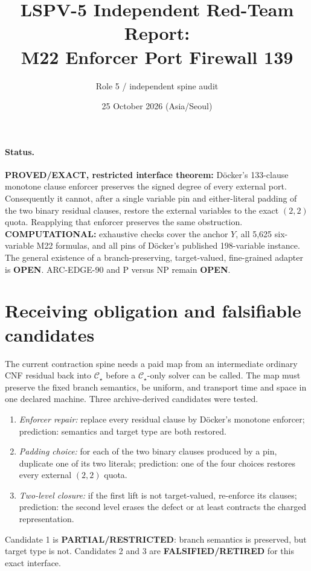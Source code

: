 \documentclass[11pt]{article}
\title{LSPV-5 Independent Red-Team Report:\\M22 Enforcer Port Firewall 139}
\author{Role 5 / independent spine audit}
\date{25 October 2026 (Asia/Seoul)}
\newcommand{\CS}{\mathcal C_\star}
\newcommand{\OPEN}{\textbf{OPEN}}
\begin{document}
\maketitle

\paragraph{Status.}
\textbf{PROVED/EXACT, restricted interface theorem:} D\"ocker's 133-clause
monotone clause enforcer preserves the signed degree of every external port.
Consequently it cannot, after a single variable pin and either-literal padding
of the two binary residual clauses, restore the external variables to the
exact $(2,2)$ quota.  Reapplying that enforcer preserves the same obstruction.
\textbf{COMPUTATIONAL:} exhaustive checks cover the anchor $Y$, all 5,625
six-variable M22 formulas, and all pins of D\"ocker's published 198-variable
instance.  The general existence of a branch-preserving, target-valued,
fine-grained adapter is \OPEN.  ARC-EDGE-90 and P versus NP remain \OPEN.

\section{Receiving obligation and falsifiable candidates}
The current contraction spine needs a paid map from an intermediate ordinary
CNF residual back into $\CS$ before a $\CS$-only solver can be called.  The map
must preserve the fixed branch semantics, be uniform, and transport time and
space in one declared machine.  Three archive-derived candidates were tested.
\begin{enumerate}
\item \emph{Enforcer repair:} replace every residual clause by D\"ocker's
  monotone enforcer; prediction: semantics and target type are both restored.
\item \emph{Padding choice:} for each of the two binary clauses produced by a
  pin, duplicate one of its two literals; prediction: one of the four choices
  restores every external $(2,2)$ quota.
\item \emph{Two-level closure:} if the first lift is not target-valued,
  re-enforce its clauses; prediction: the second level erases the defect or at
  least contracts the charged representation.
\end{enumerate}
Candidate 1 is 
\textbf{PARTIAL/RESTRICTED}: branch semantics is preserved, but target type is
not.  Candidates 2 and 3 are \textbf{FALSIFIED/RETIRED} for this exact
interface.
\end{document}
